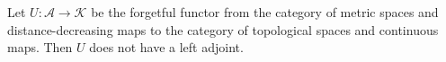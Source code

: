 Let $U: \mathcal{A} \longrightarrow \mathcal{K}$ be the forgetful functor from the category of metric spaces and distance-decreasing maps to the category of topological spaces and continuous maps. Then $U$ does not have a left adjoint.
